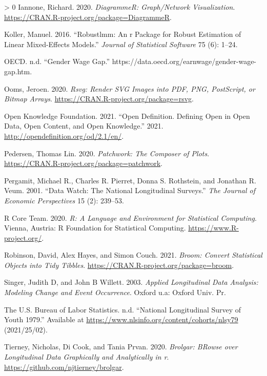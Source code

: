 \documentclass[12pt]{article}
\newlength{\cslhangindent}
\newenvironment{CSLReferences}[3] %
 {%
  \setlength{\parindent}{0pt}
  \ifodd #1 \everypar{\setlength{\hangindent}{\cslhangindent}}\ignorespaces\fi
  \ifnum #2 > 0
  \setlength{\parskip}{#2\baselineskip}
  \fi
 }%
 {}
\begin{document}
\begin{CSLReferences}{1}{0}
\leavevmode\hypertarget{ref-DiagrammeR}{}%
Iannone, Richard. 2020. \emph{DiagrammeR: Graph/Network Visualization}. \url{https://CRAN.R-project.org/package=DiagrammeR}.

\leavevmode\hypertarget{ref-KollerManuel2016rARP}{}%
Koller, Manuel. 2016. {``Robustlmm: An r Package for Robust Estimation of Linear Mixed-Effects Models.''} \emph{Journal of Statistical Software} 75 (6): 1--24.

\leavevmode\hypertarget{ref-OECD}{}%
OECD. n.d. {``Gender Wage Gap.''} https://data.oecd.org/earnwage/gender-wage-gap.htm.

\leavevmode\hypertarget{ref-rsvg}{}%
Ooms, Jeroen. 2020. \emph{Rsvg: Render SVG Images into PDF, PNG, PostScript, or Bitmap Arrays}. \url{https://CRAN.R-project.org/package=rsvg}.

\leavevmode\hypertarget{ref-opendata}{}%
Open Knowledge Foundation. 2021. {``Open Definition. Defining Open in Open Data, Open Content, and Open Knowledge.''} 2021. \url{http://opendefinition.org/od/2.1/en/}.

\leavevmode\hypertarget{ref-patchwork}{}%
Pedersen, Thomas Lin. 2020. \emph{Patchwork: The Composer of Plots}. \url{https://CRAN.R-project.org/package=patchwork}.

\leavevmode\hypertarget{ref-MichaelRPergamit2001DWTN}{}%
Pergamit, Michael R., Charles R. Pierret, Donna S. Rothstein, and Jonathan R. Veum. 2001. {``Data Watch: The National Longitudinal Surveys.''} \emph{The Journal of Economic Perspectives} 15 (2): 239--53.

\leavevmode\hypertarget{ref-R}{}%
R Core Team. 2020. \emph{R: A Language and Environment for Statistical Computing}. Vienna, Austria: R Foundation for Statistical Computing. \url{https://www.R-project.org/}.

\leavevmode\hypertarget{ref-broom}{}%
Robinson, David, Alex Hayes, and Simon Couch. 2021. \emph{Broom: Convert Statistical Objects into Tidy Tibbles}. \url{https://CRAN.R-project.org/package=broom}.

\leavevmode\hypertarget{ref-SingerJudithD2003Alda}{}%
Singer, Judith D, and John B Willett. 2003. \emph{Applied Longitudinal Data Analysis: Modeling Change and Event Occurrence}. Oxford u.a: Oxford Univ. Pr.

\leavevmode\hypertarget{ref-nlsy79}{}%
The U.S. Bureau of Labor Statistics. n.d. {``National Longitudinal Survey of Youth 1979.''} Available at \url{https://www.nlsinfo.org/content/cohorts/nlsy79} (2021/25/02).

\leavevmode\hypertarget{ref-brolgar}{}%
Tierney, Nicholas, Di Cook, and Tania Prvan. 2020. \emph{Brolgar: BRowse over Longitudinal Data Graphically and Analytically in r}. \url{https://github.com/njtierney/brolgar}.


\end{CSLReferences}
\end{document}

